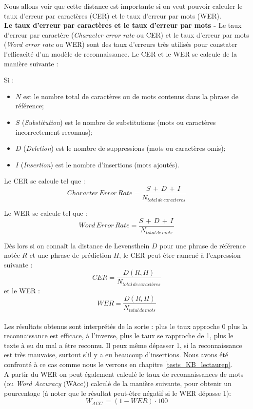Nous allons voir que cette distance est importante si on veut pouvoir calculer le taux d'erreur par caractères (CER) et le taux d'erreur par mots (WER).\\ 

\textbf{Le taux d'erreur par caractères et le taux d'erreur par mots -} Le taux d'erreur par caractère (\textit{Character error rate} ou CER) et le taux d'erreur par mots (\textit{Word error rate} ou WER) sont des taux d'erreurs très utilisés pour constater l'efficacité d'un modèle de reconnaissance. Le CER et le WER se calcule de la manière suivante :

Si : 

\begin{itemize}
    \item $N$ est le nombre total de caractères ou de mots contenus dans la phrase de référence;
    \item $S$ (\textit{Substitution}) est le nombre de substitutions (mots ou caractères incorrectement reconnus);
    \item $D$ (\textit{Deletion}) est le nombre de suppressions (mots ou caractères omis);
    \item $I$ (\textit{Insertion}) est le nombre d'insertions (mots ajoutés).
\end{itemize}

Le CER se calcule tel que : $$ Character\, Error\, Rate = \frac{S\, + \,D\, + \,I\,}{N_{total\, de\, caracteres}} $$

Le WER se calcule tel que : $$ Word\, Error\, Rate = \frac{S\, + \,D\, + \,I\,}{N_{total\, de\, mots}} $$

Dès lors si on connaît la distance de Levensthein $D$ pour une phrase de référence notée $R$ et une phrase de prédiction $H$, le CER peut être ramené à l'expression suivante : $$CER = \frac{D(R,H)}{N_{total\, de\, caractères}}$$  et le WER :$$WER = \frac{D(R,H)}{N_{total\, de\, mots}}$$\\

Les résultats obtenus sont interprétés de la sorte : plus le taux approche 0 plus la reconnaissance est efficace, à l'inverse, plus le taux se rapproche de 1, plus le texte à eu du mal a être reconnu. Il peux même dépasser 1, si la reconnaissance est très mauvaise, surtout s'il y a eu beaucoup d'insertions. Nous avons été confronté à ce cas comme nous le verrons en chapitre \ref{tests_KB_lectaurep}.\\
\newpage
A partir du WER on peut également calculé le taux de reconnaissances de mots (ou \textit{Word Accuracy} (WAcc)) calculé de la manière suivante, pour obtenir un pourcentage (à noter que le résultat peut-être négatif si le WER dépasse 1): $$W_{ACC}\, = (1 - WER) \cdot 100  $$

